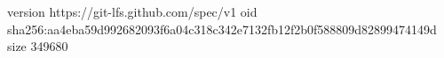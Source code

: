 version https://git-lfs.github.com/spec/v1
oid sha256:aa4eba59d992682093f6a04c318c342e7132fb12f2b0f588809d82899474149d
size 349680
